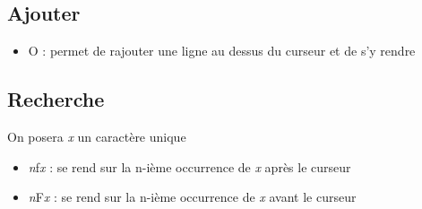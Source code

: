 \documentclass{article}
\begin{document}
\subsection{Ajouter}
\begin{itemize}
    \item O : permet de rajouter une ligne au dessus du curseur et de s'y rendre
\end{itemize}





\subsection{Recherche}
On posera \textit{x} un caractère unique
\begin{itemize}
    \item \textit{n}f\textit{x} : se rend sur la n-ième occurrence de \textit{x} après le curseur
    \item \textit{n}F\textit{x} : se rend sur la n-ième occurrence de \textit{x} avant le curseur
\end{itemize}
\end{document}
